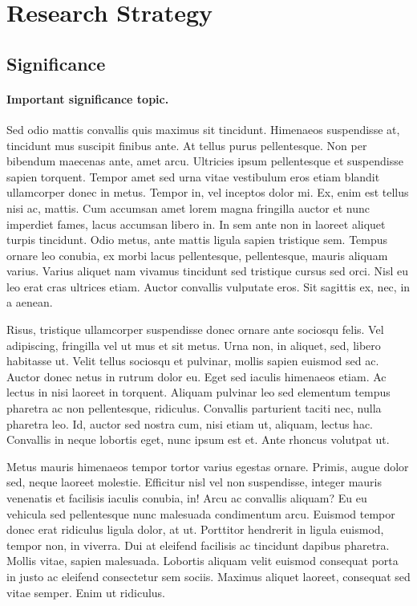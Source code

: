 \documentclass[11pt,]{article}
\title{}
\author{}
\date{}
\let\oldparagraph\paragraph
\renewcommand{\paragraph}[1]{\oldparagraph{#1}\mbox{}}
\begin{document}
\hypertarget{research-strategy}{%
\section{Research Strategy}\label{research-strategy}}

\hypertarget{significance}{%
\subsection{Significance}\label{significance}}

\hypertarget{important-significance-topic.}{%
\paragraph{Important significance
topic.}\label{important-significance-topic.}}

Sed odio mattis convallis quis maximus sit tincidunt. Himenaeos
suspendisse at, tincidunt mus suscipit finibus ante. At tellus purus
pellentesque. Non per bibendum maecenas ante, amet arcu. Ultricies ipsum
pellentesque et suspendisse sapien torquent. Tempor amet sed urna vitae
vestibulum eros etiam blandit ullamcorper donec in metus. Tempor in, vel
inceptos dolor mi. Ex, enim est tellus nisi ac, mattis. Cum accumsan
amet lorem magna fringilla auctor et nunc imperdiet fames, lacus
accumsan libero in. In sem ante non in laoreet aliquet turpis tincidunt.
Odio metus, ante mattis ligula sapien tristique sem. Tempus ornare leo
conubia, ex morbi lacus pellentesque, pellentesque, mauris aliquam
varius. Varius aliquet nam vivamus tincidunt sed tristique cursus sed
orci. Nisl eu leo erat cras ultrices etiam. Auctor convallis vulputate
eros. Sit sagittis ex, nec, in a aenean.

Risus, tristique ullamcorper suspendisse donec ornare ante sociosqu
felis. Vel adipiscing, fringilla vel ut mus et sit metus. Urna non, in
aliquet, sed, libero habitasse ut. Velit tellus sociosqu et pulvinar,
mollis sapien euismod sed ac. Auctor donec netus in rutrum dolor eu.
Eget sed iaculis himenaeos etiam. Ac lectus in nisi laoreet in torquent.
Aliquam pulvinar leo sed elementum tempus pharetra ac non pellentesque,
ridiculus. Convallis parturient taciti nec, nulla pharetra leo. Id,
auctor sed nostra cum, nisi etiam ut, aliquam, lectus hac. Convallis in
neque lobortis eget, nunc ipsum est et. Ante rhoncus volutpat ut.

Metus mauris himenaeos tempor tortor varius egestas ornare. Primis,
augue dolor sed, neque laoreet molestie. Efficitur nisl vel non
suspendisse, integer mauris venenatis et facilisis iaculis conubia, in!
Arcu ac convallis aliquam? Eu eu vehicula sed pellentesque nunc
malesuada condimentum arcu. Euismod tempor donec erat ridiculus ligula
dolor, at ut. Porttitor hendrerit in ligula euismod, tempor non, in
viverra. Dui at eleifend facilisis ac tincidunt dapibus pharetra. Mollis
vitae, sapien malesuada. Lobortis aliquam velit euismod consequat porta
in justo ac eleifend consectetur sem sociis. Maximus aliquet laoreet,
consequat sed vitae semper. Enim ut ridiculus.
\end{document}
